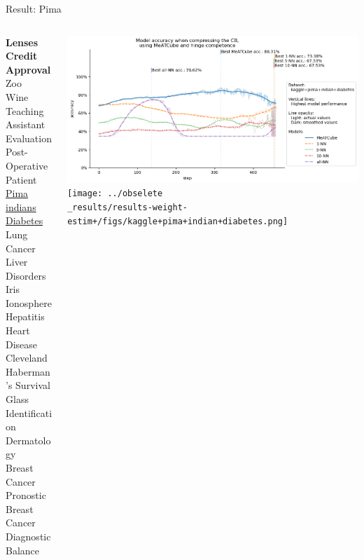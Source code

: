 \documentclass[]{beamer}
\begin{document}
\begin{frame}{Result: Pima}
    \begin{columns}
        \begin{column}{.3\textwidth}
            {\smaller\smaller\smaller
            \textbf{Lenses} \\
            \textbf{Credit Approval} \\
            Zoo \\
            Wine \\
            Teaching Assistant Evaluation \\
            Post-Operative Patient \\
            \underline{Pima indians Diabetes} \\
            Lung Cancer \\
            Liver Disorders \\
            Iris \\
            Ionosphere \\
            Hepatitis \\
            Heart Disease Cleveland \\
            Haberman's Survival \\
            Glass Identification \\
            Dermatology \\
            Breast Cancer Pronostic \\
            Breast Cancer Diagnostic \\
            Balance\\
            ~}
        \end{column}
        \begin{column}{.7\textwidth}
            \includegraphics[width=\textwidth]{../results-no-sim-tuning+/figs/kaggle+pima+indian+diabetes.png}
            \texttt{[image: ../obselete\\\_results/results-weight-estim+/figs/kaggle+pima+indian+diabetes.png]}
        \end{column}
    \end{columns}
\end{frame}
\end{document}
